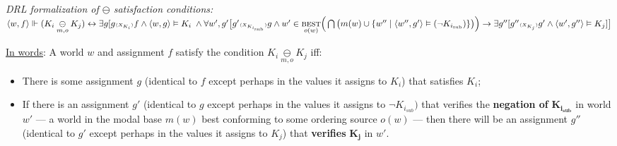 
\pex\textit{DRL formalization of $\ominus  $ satisfaction conditions:}\label{satcon}\\ 
$\langle w,f\rangle \Vdash(K_i\underset{m,o}{\ominus} K_j)\leftrightarrow\exists g[g{\scriptscriptstyle\langle X_{K_i}\rangle}f\wedge\langle w,g\rangle\vDash K_i 
\;\wedge\\  
\forall w',g'\big[g'{\scriptscriptstyle\langle X_{K_{i_\text{sub}}}\rangle}g\wedge w'\in\underset{o(w)}{\textsc{best}}\Big(\bigcap\big(m(w)\cup\{w''\mid\langle w'',g'\rangle\vDash(\neg K_{i_{\text{sub}}})\}\big)\Big)\\
\to\exists g''[g''{\scriptscriptstyle\langle X_{K_j}\rangle}g'\wedge \langle w',g''\rangle\vDash K_j]\big]$

\ul{In words}: A world $ w $ and assignment $ f $ satisfy the condition $ K_{i}\underset{m,o}{\ominus} K_j $ iff: \vspace*{-0.75em}
\begin{itemize}
	\item There is some assignment $g$ (identical to $f$ except perhaps in the values it assigns to $ K_{i} $) that satisfies $ K_i $; \vspace*{-0.45em}
	\item If there is an assignment $g'$ (identical to $g$ except perhaps in the values it assigns to $ \neg K_{i_{sub}}) $ that verifies the  \textbf{negation of} $ \boldsymbol{K_{i_{\textbf{sub}}}} $ in world $ w' $ --- a world in the modal base $ m(w) $ best conforming to some ordering source $ o(w) $ --- then there will be an assignment $g''$ (identical to $ g' $ except perhaps in the values it assigns to $ K_{j} $) that \textbf{verifies} $ \boldsymbol{K_j} $ in $ w' $.
\end{itemize}
\xe

